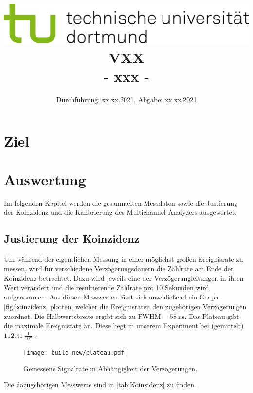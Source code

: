 
\usepackage{romannum}
\usepackage{listings}
\lstset{numbers=left, numberstyle=\tiny, numbersep=5pt}
\lstset{language=Perl}

\title{\includegraphics[scale=0.8]{../logo.jpg} \\ \vspace*{1cm} VXX \\ - xxx -}

\date{Durchführung: xx.xx.2021, Abgabe: xx.xx.2021}



\maketitle

\tableofcontents
\newpage

\section{Ziel}


\section{Auswertung}
Im folgenden Kapitel werden die gesammelten Messdaten sowie die Justierung der Koinzidenz und 
die Kalibrierung des Multichannel Analyzers ausgewertet.


\subsection{Justierung der Koinzidenz}
Um während der eigentlichen Messung in einer möglichst großen Ereignisrate zu messen, wird
für verschiedene Verzögerungsdauern die Zählrate am Ende der Koinzidenz betrachtet.
Dazu wird jeweils eine der Verzögerungleitungen in ihren Wert verändert und die resultierende Zählrate pro 10 Sekunden
wird aufgenommen.
Aus diesen Messwerten lässt sich anschließend ein Graph \autoref{fig:koinzidenz} plotten, 
welcher die Ereignisraten den zugehörigen Verzögerungen zuordnet.
Die Halbwertsbreite ergibt sich zu $\text{FWHM} = \SI{58}{\nano\second}$.
Das Plateau gibt die maximale Ereignisrate an. 
Diese liegt in unserem Experiment bei (gemittelt) $\SI{112,41}{\frac{1}{10 \second}}$ .
\begin{figure}
    \centering
    \texttt{[image: build\_new/plateau.pdf]}
    \caption{Gemessene Signalrate in Abhängigkeit der Verzögerungen.}
    \label{fig:koinzidenz}
\end{figure}
\FloatBarrier
Die dazugehörigen Messwerte sind in \autoref{tab:Koinzidenz} zu finden.
\FloatBarrier

